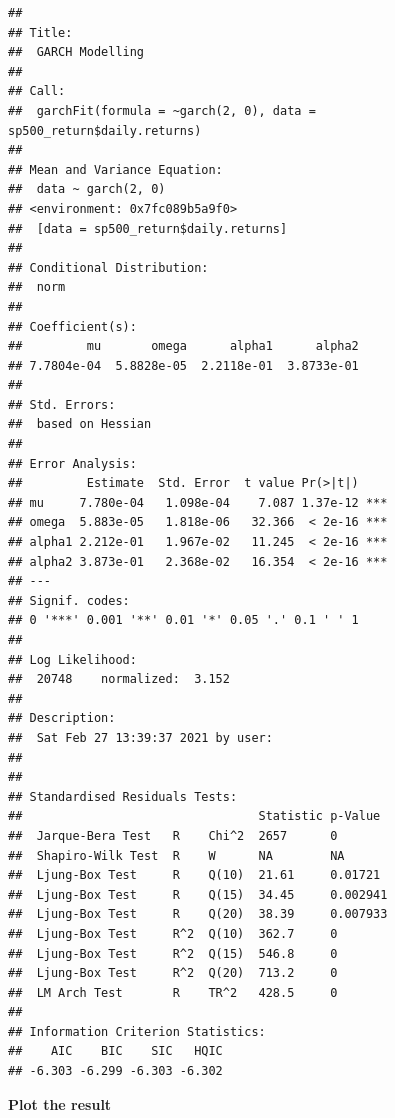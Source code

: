 \documentclass[]{book}
\begin{document}
\begin{verbatim}
## 
## Title:
##  GARCH Modelling 
## 
## Call:
##  garchFit(formula = ~garch(2, 0), data = sp500_return$daily.returns) 
## 
## Mean and Variance Equation:
##  data ~ garch(2, 0)
## <environment: 0x7fc089b5a9f0>
##  [data = sp500_return$daily.returns]
## 
## Conditional Distribution:
##  norm 
## 
## Coefficient(s):
##         mu       omega      alpha1      alpha2  
## 7.7804e-04  5.8828e-05  2.2118e-01  3.8733e-01  
## 
## Std. Errors:
##  based on Hessian 
## 
## Error Analysis:
##         Estimate  Std. Error  t value Pr(>|t|)    
## mu     7.780e-04   1.098e-04    7.087 1.37e-12 ***
## omega  5.883e-05   1.818e-06   32.366  < 2e-16 ***
## alpha1 2.212e-01   1.967e-02   11.245  < 2e-16 ***
## alpha2 3.873e-01   2.368e-02   16.354  < 2e-16 ***
## ---
## Signif. codes:  
## 0 '***' 0.001 '**' 0.01 '*' 0.05 '.' 0.1 ' ' 1
## 
## Log Likelihood:
##  20748    normalized:  3.152 
## 
## Description:
##  Sat Feb 27 13:39:37 2021 by user:  
## 
## 
## Standardised Residuals Tests:
##                                 Statistic p-Value 
##  Jarque-Bera Test   R    Chi^2  2657      0       
##  Shapiro-Wilk Test  R    W      NA        NA      
##  Ljung-Box Test     R    Q(10)  21.61     0.01721 
##  Ljung-Box Test     R    Q(15)  34.45     0.002941
##  Ljung-Box Test     R    Q(20)  38.39     0.007933
##  Ljung-Box Test     R^2  Q(10)  362.7     0       
##  Ljung-Box Test     R^2  Q(15)  546.8     0       
##  Ljung-Box Test     R^2  Q(20)  713.2     0       
##  LM Arch Test       R    TR^2   428.5     0       
## 
## Information Criterion Statistics:
##    AIC    BIC    SIC   HQIC 
## -6.303 -6.299 -6.303 -6.302
\end{verbatim}

\textbf{Plot the result}
\end{document}
